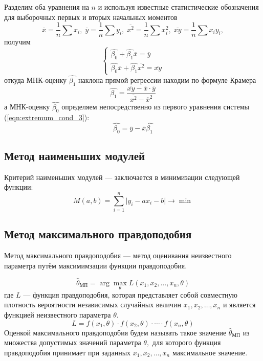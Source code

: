 \documentclass[12pt,a4paper]{article}
\begin{document}
			Разделим оба уравнения на $n$ и используя известные статистические обозначения для выборочных первых и вторых начальных моментов
			$$\overline{x} = \frac{1}{n} \sum x_i,\; \overline{y} = \frac{1}{n} \sum y_i,\; \overline{x^2} = \frac{1}{n} \sum x^2_i,\; \overline{xy} = \frac{1}{n} \sum x_iy_i,$$
			получим
			\begin{equation}\label{eqn:extremum_cond_3}
			\begin{cases}
			\hat{\beta_0} + \hat{\beta_1}\overline{x} = \overline{y}\\
			\hat{\beta_0}\overline{x} + \hat{\beta_1} \overline{x^2} = \overline{xy}
			\end{cases}
			\end{equation}	
			откуда МНК-оценку $\hat{\beta_1}$ наклона прямой регрессии находим по формуле
			Крамера
			\begin{equation}\label{eqn:beta_1}
			\hat{\beta_1} = \frac{\overline{xy} - \overline{x} \cdot \overline{y}}{\overline{x^2} - {\overline{x}}^2}
			\end{equation}
			а МНК-оценку $\hat{\beta_0}$ определяем непосредственно из первого уравнения системы (\ref{eqn:extremum_cond_3}):
			\begin{equation}\label{eqn:beta_0}
			\hat{\beta_0} = \overline{y} - \overline{x}\hat{\beta_1}
			\end{equation}
			
	\subsection{Метод наименьших модулей}
		Критерий наименьших модулей --- заключается в минимизации следующей функции:
		\begin{equation} \label{least_abs}
		M(a,b) = \sum\limits_{i=1}^n\vert y_i-ax_i-b\vert\to\min
		\end{equation}
	
	\subsection{Метод максимального правдоподобия}
		Метод максимального правдоподобия --- метод оценивания неизвестного параметра путём максимимзации функции правдоподобия.
		
		\begin{equation}
		\hat{\theta}_{\text{МП}} = \arg \max_\theta L(x_1,x_2,\ldots,x_n,\theta)
		\end{equation}
		где $L$ --- функция правдоподобия, которая представляет собой совместную плотность вероятности независимых случайных величин $x_1,x_2,\ldots,x_n$ и является функцией неизвестного параметра $\theta$.
		\begin{equation}
		L = f(x_1,\theta)\cdot f(x_2,\theta)\cdot\cdots\cdot f(x_n,\theta)
		\end{equation}
		Оценкой максимального правдоподобия будем называть такое значение $\hat{\theta}_{\text{МП}}$ из множества допустимых значений параметра $\theta,$ для которого функция правдоподобия принимает при заданных $x_1, x_2, \ldots, x_n$ максимальное значение.
		
\end{document}
